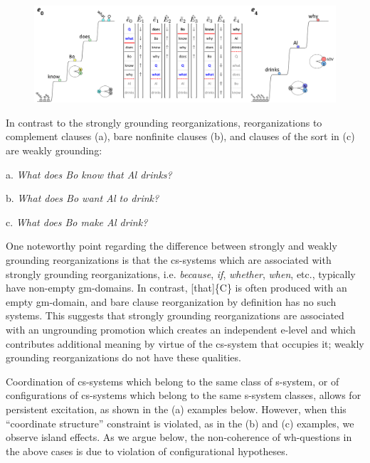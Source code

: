   
\begin{figure}
\includegraphics[width=\textwidth]{figures/Tilsen-img164.png}
\caption{\missingcaption}
\label{fig:}
\end{figure}
 

  In contrast to the strongly grounding reorganizations, reorganizations to complement clauses (a), bare nonfinite clauses (b), and clauses of the sort in (c) are weakly grounding:

  a.  \textit{What does Bo know that Al drinks?}

  b.  \textit{What does Bo want Al to drink?}

  c.  \textit{What does Bo make Al drink?}

  One noteworthy point regarding the difference between strongly and weakly grounding reorganizations is that the cs-systems which are associated with strongly grounding reorganizations, i.e. \textit{because}, \textit{if}, \textit{whether}, \textit{when}, etc., typically have non-empty gm-domains. In contrast, [that]\{C\} is often produced with an empty gm-domain, and bare clause reorganization by definition has no such systems. This suggests that strongly grounding reorganizations are associated with an ungrounding promotion which creates an independent e-level and which contributes additional meaning by virtue of the cs-system that occupies it; weakly grounding reorganizations do not have these qualities.

  Coordination of cs-systems which belong to the same class of s-system, or of configurations of cs-systems which belong to the same s-system classes, allows for persistent excitation, as shown in the (a) examples below. However, when this “coordinate structure” constraint is violated, as in the (b) and (c) examples, we observe island effects. As we argue below, the non-coherence of wh-questions in the above cases is due to violation of configurational hypotheses.

